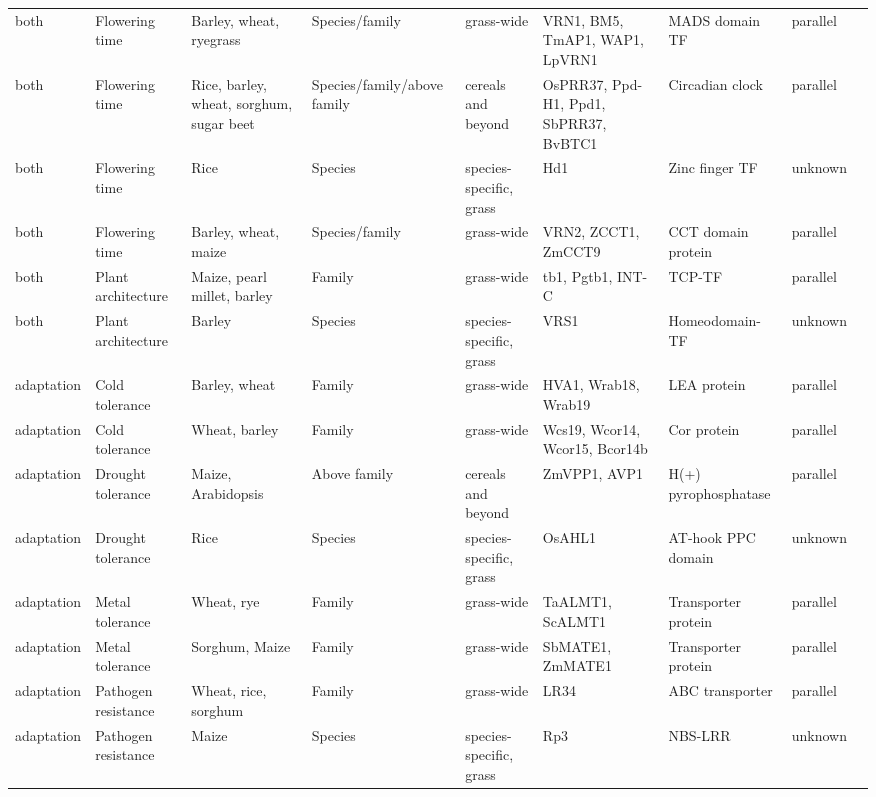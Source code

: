 \documentclass[12pt]{article}
\begin{document}
\begin{table}
\begin{center}
\begin{tabular}{C{1.5cm}G{2.5cm}C{3.10cm}C{3.2cm}C{2.3cm}G{3.5cm}G{2.1cm}C{1.3cm}G{1.5cm}}
 both & Flowering time &Barley, wheat, ryegrass & Species/family & grass-wide & VRN1, BM5, TmAP1, WAP1, LpVRN1 & MADS domain TF & parallel & \citep{Asp2011}\\
 both & Flowering time &Rice, barley, wheat, sorghum, sugar beet & Species/family/above family & cereals and beyond & OsPRR37, Ppd-H1, Ppd1, SbPRR37, BvBTC1 & Circadian clock& parallel & \citep{MURAKAMI2005, Turner2005, Jones2008, Beales2007, Wilhelm2008, Daz2012}\\
 both & Flowering time &Rice & Species & species-specific, grass & Hd1 & Zinc finger TF & unknown & \citep{Martin2013}\\
both & Flowering time &Barley, wheat, maize & Species/family & grass-wide & VRN2, ZCCT1, ZmCCT9 & CCT domain protein& parallel & \citep{Huang2017}\\
 both & Plant architecture &Maize, pearl millet, barley & Family & grass-wide & tb1, Pgtb1, INT-C & TCP-TF & parallel & \citep{Studer2011, Remigereau2011, Ramsay2011}\\
 both & Plant architecture &Barley & Species & species-specific, grass & VRS1 & Homeodomain-TF & unknown & \citep{Martin2013}\\
 adaptation & Cold tolerance &Barley, wheat & Family & grass-wide & HVA1, Wrab18, Wrab19 & LEA protein & parallel & \citep{Hong1988, pmid16755132}\\
 adaptation & Cold tolerance &Wheat, barley & Family & grass-wide & Wcs19, Wcor14, Wcor15, Bcor14b & Cor protein & parallel & \citep{Takumi2003}\\
 adaptation & Drought tolerance &Maize, Arabidopsis & Above family & cereals and beyond & ZmVPP1, AVP1 & H(+) pyrophosphatase & parallel & \citep{Wang2016}\\
 adaptation & Drought tolerance &Rice & Species & species-specific, grass & OsAHL1 & AT-hook PPC domain & unknown & \citep{Zhou2016}\\
 adaptation & Metal tolerance &Wheat, rye & Family & grass-wide & TaALMT1, ScALMT1 & Transporter protein & parallel & \citep{Martin2013}\\
 adaptation & Metal tolerance &Sorghum, Maize & Family & grass-wide & SbMATE1, ZmMATE1 & Transporter protein & parallel & \citep{Martin2013}\\
 adaptation & Pathogen resistance &Wheat, rice, sorghum & Family & grass-wide & LR34 & ABC transporter & parallel & \citep{Krattinger2010}\\
 adaptation & Pathogen resistance &Maize & Species & species-specific, grass & Rp3 & NBS-LRR & unknown & \citep{pmid12242248}\\

\end{tabular}
\end{center}
\end{table}
\end{document}
